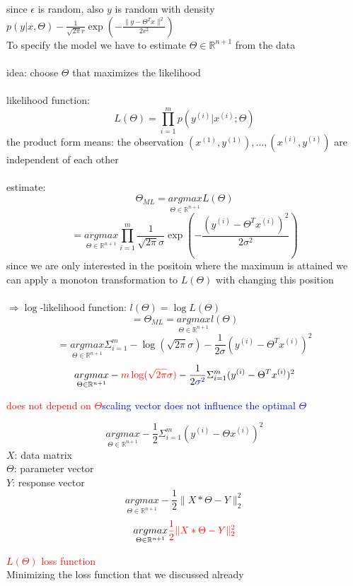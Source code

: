 \begin{enumerate}[(1)]
since $\epsilon$ is random, also $y$ is random with density $p(y|x, \Theta) - \frac{1}{\sqrt{2\pi}r} \exp (- \frac{\lVert y- \Theta^T x\lVert^2}{2r^2})$\\
To specify the model we have to estimate $\Theta \in \mathbb{R}^{n+1}$ from the data\\\\
idea: choose $\Theta$ that maximizes the likelihood\\\\
likelihood function:
\[L(\Theta) = \prod^m_{i=1} p(y^{(i)}|x^{(i)};\Theta)\]
the product form means: the observation $(x^{(1)},y^{(1)}), \dots , (x^{(i)}, y^{(i)})$ are independent of each other\\\\
estimate:
\[ \Theta_{ML} = \underset{\Theta \in \mathbb{R}^{n+1}}{argmax} L(\Theta) \]
\[ = \underset{\Theta \in \mathbb{R}^{n+1}}{argmax} \prod^m_{i=1} \frac{1}{\sqrt{2 \pi} \sigma} \exp \left(- \frac{(y^{(i)} - \Theta^T x^{(i)})^2}{2 \sigma^2}\right)\]
since we are only interested in the positoin where the maximum is attained we can apply a monoton transformation to $L(\Theta)$ with changing this position\\\\
$\Rightarrow \log$-likelihood function: $l(\Theta) = \log L(\Theta)$
\[ = \Theta_{ML} = \underset{\Theta \in \mathbb{R}^{n+1}}{argmax} l(\Theta)\]
\[ = \underset{\Theta \in \mathbb{R}^{n+1}}{argmax} \Sigma^m_{i=1} - \log (\sqrt{2\pi}\sigma) - \frac{1}{2\sigma}(y^{(i)} - \Theta^T x^{(i)})^2\]
\[\underset{\Theta \in \mathbb{R}^{n+1}}{argmax} - \textcolor{red}{m \log (\sqrt{2\pi}\sigma)} - \frac{1}{2\textcolor{blue}{\sigma^2}}\Sigma^m_{i=1}(y^{(i)} - \Theta^T x^{(i)})^2  \]
\begin{center}
\textcolor{red}{does not depend on $\Theta$}\space\space\space \textcolor{blue}{scaling vector does not influence the optimal $\Theta$}
\end{center}
\[ \underset{\Theta \in \mathbb{R}^{n+1}}{argmax} -\frac{1}{2} \Sigma^m_{i=1}(y^{(i)}-\Theta x^{(i)})^2\]
$X$: data matrix\\
$\Theta$: parameter vector\\
$Y$: response vector
\[\underset{\Theta \in \mathbb{R}^{n+1}}{argmax} -\frac{1}{2} \lVert X * \Theta - Y \lVert^2_2\]
\[ \underset{\Theta \in \mathbb{R}^{n+1}}{argmax} \textcolor{red}{\frac{1}{2} \lVert X * \Theta - Y \lVert^2_2}\]
\begin{center}
\textcolor{red}{$L(\Theta)$ loss function}\\
Minimizing the loss function that we discussed already\\
\end{center}
\end{enumerate}

